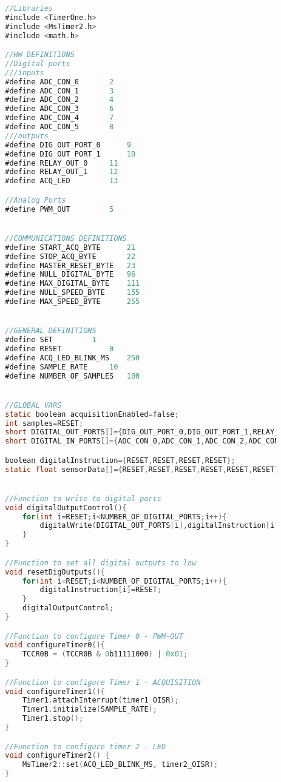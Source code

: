 	\begin{lstlisting}[language=C]
	
		//Libraries
		#include <TimerOne.h>
		#include <MsTimer2.h>
		#include <math.h>

		//HW DEFINITIONS
		//Digital ports
		///inputs
		#define	ADC_CON_0		2
		#define	ADC_CON_1		3
		#define	ADC_CON_2		4
		#define	ADC_CON_3		6
		#define	ADC_CON_4		7
		#define	ADC_CON_5		8
		///outputs
		#define DIG_OUT_PORT_0		9
		#define	DIG_OUT_PORT_1		10
		#define RELAY_OUT_0		11
		#define RELAY_OUT_1		12
		#define	ACQ_LED			13

		//Analog Ports
		#define	PWM_OUT			5


		//COMMUNICATIONS DEFINITIONS
		#define START_ACQ_BYTE		21
		#define	STOP_ACQ_BYTE		22
		#define MASTER_RESET_BYTE	23
		#define NULL_DIGITAL_BYTE	96
		#define MAX_DIGITAL_BYTE	111
		#define NULL_SPEED_BYTE		155
		#define MAX_SPEED_BYTE		255


		//GENERAL DEFINITIONS
		#define SET			1
		#define RESET			0
		#define ACQ_LED_BLINK_MS	250
		#define SAMPLE_RATE		10
		#define NUMBER_OF_SAMPLES	100


		//GLOBAL VARS
		static boolean acquisitionEnabled=false;
		int samples=RESET;
		short DIGITAL_OUT_PORTS[]={DIG_OUT_PORT_0,DIG_OUT_PORT_1,RELAY_OUT_0,RELAY_OUT_1};
		short DIGITAL_IN_PORTS[]={ADC_CON_0,ADC_CON_1,ADC_CON_2,ADC_CON_3,ADC_CON_4,ADC_CON_5};

		boolean digitalInstruction={RESET,RESET,RESET,RESET};
		static float sensorData[]={RESET,RESET,RESET,RESET,RESET,RESET};


		//Function to write to digital ports
		void digitalOutputControl(){
			for(int i=RESET;i<NUMBER_OF_DIGITAL_PORTS;i++){
				digitalWrite(DIGITAL_OUT_PORTS[i],digitalInstruction[i])
			}
		}

		//Function to set all digital outputs to low
		void resetDigOutputs(){
			for(int i=RESET;i<NUMBER_OF_DIGITAL_PORTS;i++){
				digitalInstruction[i]=RESET;
			}
			digitalOutputControl;
		}

		//Function to configure Timer 0 - PWM-OUT
		void configureTimer0(){
			TCCR0B = (TCCR0B & 0b11111000) | 0x01;
		}

		//Function to configure Timer 1 - ACQUISITION 
		void configureTimer1(){
			Timer1.attachInterrupt(timer1_OISR);
			Timer1.initialize(SAMPLE_RATE);
			Timer1.stop();
		}

		//Function to configure timer 2 - LED
		void configureTimer2() {
			MsTimer2::set(ACQ_LED_BLINK_MS, timer2_OISR); 
		}


\end{lstlisting}

